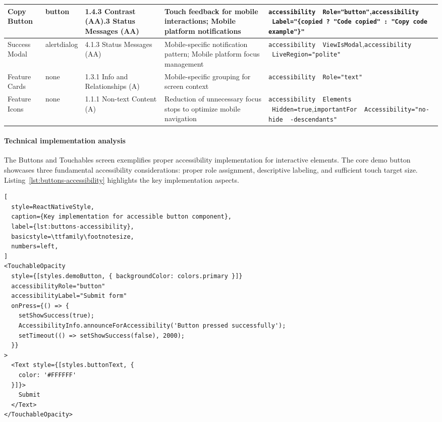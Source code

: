 \begin{longtable}[c]{|C{2.5cm}|C{2cm}|C{2.8cm}|C{2.8cm}|C{4.7cm}|}
\hline
Copy Button & button & 1.4.3 Contrast (AA).3 Status Messages (AA) & Touch feedback for mobile interactions; Mobile platform notifications & \texttt{accessibility \ Role="button"},\newline \texttt{accessibility \ Label="\{copied ? "Code copied" : "Copy code example"\}"} \\
\hline
Success Modal & alertdialog & 4.1.3 Status Messages (AA) & Mobile-specific notification pattern; Mobile platform focus management & \texttt{accessibility \ ViewIsModal},\newline \texttt{accessibility \ LiveRegion="polite"} \\
\hline
Feature Cards & none & 1.3.1 Info and Relationships (A) & Mobile-specific grouping for screen context & \texttt{accessibility \ Role="text"} \\
\hline
Feature Icons & none & 1.1.1 Non-text Content (A) & Reduction of unnecessary focus stops to optimize mobile navigation & \texttt{accessibility \ Elements \ Hidden=true},\newline \texttt{importantFor \ Accessibility="no-hide \ -descendants"} \\
\end{longtable}
\FloatBarrier

\paragraph{Technical implementation analysis}

The Buttons and Touchables screen exemplifies proper accessibility implementation for interactive elements. The core demo button showcases three fundamental accessibility considerations: proper role assignment, descriptive labeling, and sufficient touch target size. Listing~\ref{lst:buttons-accessibility} highlights the key implementation aspects.

\begin{lstlisting}[
  style=ReactNativeStyle,
  caption={Key implementation for accessible button component},
  label={lst:buttons-accessibility},
  basicstyle=\ttfamily\footnotesize,
  numbers=left,
]
<TouchableOpacity
  style={[styles.demoButton, { backgroundColor: colors.primary }]}
  accessibilityRole="button"
  accessibilityLabel="Submit form"
  onPress={() => {
    setShowSuccess(true);
    AccessibilityInfo.announceForAccessibility('Button pressed successfully');
    setTimeout(() => setShowSuccess(false), 2000);
  }}
>
  <Text style={[styles.buttonText, {
    color: '#FFFFFF'
  }]}>
    Submit
  </Text>
</TouchableOpacity>
\end{lstlisting}
\FloatBarrier

